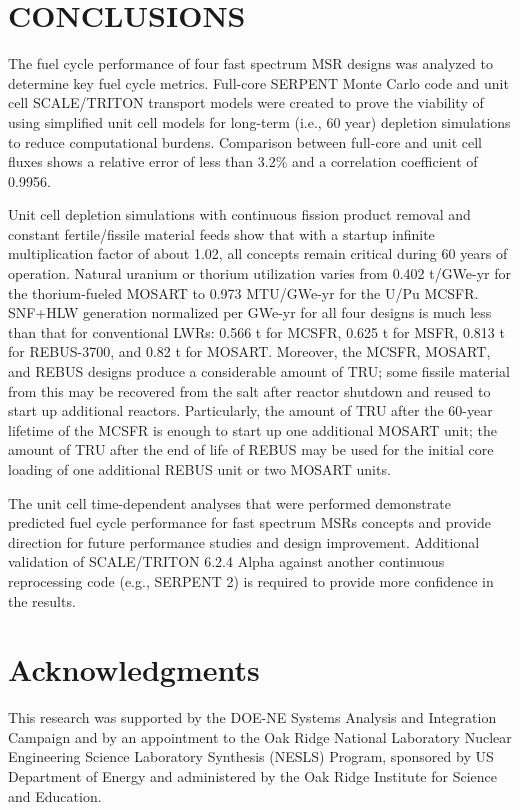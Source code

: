 \documentclass[letterpaper]{mandc2019}
\begin{document}
\section{CONCLUSIONS}
The fuel cycle performance of four fast spectrum \gls{MSR} designs was analyzed to determine key fuel cycle metrics. Full-core SERPENT Monte Carlo code and unit cell SCALE/TRITON transport models were created to prove the viability of using simplified unit cell models for long-term (i.e., 60 year) depletion simulations to reduce computational burdens. Comparison between full-core and unit cell fluxes shows a relative error of less than 3.2\% and a correlation coefficient of 0.9956.

Unit cell depletion simulations with continuous fission product removal and constant fertile/fissile material feeds show that with a startup infinite multiplication factor of about 1.02, all concepts remain critical during 60 years of operation. Natural uranium or thorium utilization varies from 0.402 t/GWe-yr for the thorium-fueled \gls{MOSART} to 0.973 MTU/GWe-yr for the U/Pu \gls{MCSFR}. \gls{SNF}+\gls{HLW} generation normalized per GWe-yr for all four designs is much less than that for conventional \glspl{LWR}: 0.566 t for \gls{MCSFR}, 0.625 t for \gls{MSFR}, 0.813 t for REBUS-3700, and 0.82 t for \gls{MOSART}. Moreover, the \gls{MCSFR}, \gls{MOSART}, and REBUS designs produce a considerable amount of \gls{TRU}; some fissile material from this may be recovered from the salt after reactor shutdown and reused to start up additional reactors. Particularly, the amount of \gls{TRU} after the 60-year lifetime of the \gls{MCSFR} is enough to start up one additional \gls{MOSART} unit; the amount of \gls{TRU} after the end of life of REBUS may be used for the initial core loading of one additional REBUS unit or two \gls{MOSART} units.

The unit cell time-dependent analyses that were performed demonstrate predicted fuel cycle performance for fast spectrum \glspl{MSR} concepts and provide direction for future performance studies and design improvement. Additional validation of SCALE/TRITON 6.2.4 Alpha against another continuous reprocessing code (e.g., SERPENT 2) is required to provide more confidence in the results.

\section{Acknowledgments}
This research was supported by the DOE-NE Systems Analysis and Integration Campaign and by an appointment to the Oak Ridge National Laboratory Nuclear Engineering Science Laboratory Synthesis (NESLS) Program, sponsored by US Department of Energy and administered by the Oak Ridge Institute for Science and Education.
\end{document}
